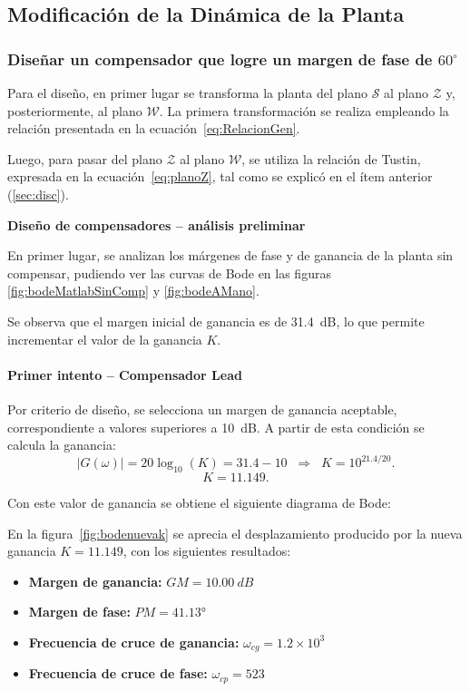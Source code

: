 \subsection{Modificación de la Dinámica de la Planta}
\subsubsection{Diseñar un compensador que logre un margen de fase de $60^\circ$} 

Para el diseño, en primer lugar se transforma la planta del plano $\mathcal{S}$ al plano $\mathcal{Z}$ y, posteriormente, al plano $\mathcal{W}$. La primera transformación se realiza empleando la relación presentada en la ecuación~\ref{eq:RelacionGen}.  

Luego, para pasar del plano $\mathcal{Z}$ al plano $\mathcal{W}$, se utiliza la relación de Tustin, expresada en la ecuación~\ref{eq:planoZ}, tal como se explicó en el ítem anterior (\ref{sec:disc}).

\textbf{Diseño de compensadores – análisis preliminar}  

En primer lugar, se analizan los márgenes de fase y de ganancia de la planta sin compensar, pudiendo ver las curvas de Bode en las figuras \ref{fig:bodeMatlabSinComp} y \ref{fig:bodeAMano}.


Se observa que el margen inicial de ganancia es de \SI{31.4}{dB}, lo que permite incrementar el valor de la ganancia $K$.  

\paragraph{Primer intento – Compensador Lead}  

Por criterio de diseño, se selecciona un margen de ganancia aceptable, correspondiente a valores superiores a \SI{10}{dB}. A partir de esta condición se calcula la ganancia:
\[
|G(\omega)| = 20 \log_{10}(K) = 31.4 - 10 
\;\;\Rightarrow\;\; K = 10^{21.4/20}.
\]
\[
K = 11.149.
\]

Con este valor de ganancia se obtiene el siguiente diagrama de Bode:


En la figura~\ref{fig:bodenuevak} se aprecia el desplazamiento producido por la nueva ganancia $K = 11.149$, con los siguientes resultados:
\begin{itemize}
	\item \textbf{Margen de ganancia:} $GM = \SI{10.00}{dB}$
	\item \textbf{Margen de fase:} $PM = \ang{41.13}$
	\item \textbf{Frecuencia de cruce de ganancia:} $\omega_{cg} = 1.2 \times 10^3$
	\item \textbf{Frecuencia de cruce de fase:} $\omega_{cp} = 523$
\end{itemize}

